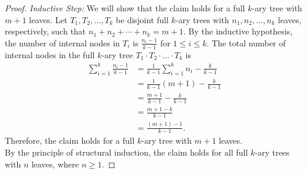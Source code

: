 \documentclass[a4paper, addpoints]{exam}
\theoremstyle{definition}
\theoremstyle{claim}
\begin{document}
\begin{questions}
\begin{solution}
\begin{proof}
      \textit{Inductive Step:} We will show that the claim holds for a full $k$-ary tree with $m+1$ leaves.
      Let $T_1,T_2,\ldots,T_k$ be disjoint full $k$-ary trees with $n_1,n_2,\ldots,n_k$ leaves, respectively, such that $n_1+n_2+\cdots+n_k=m+1$.
      By the inductive hypothesis, the number of internal nodes in $T_i$ is $\frac{n_i-1}{k-1}$ for $1\leq i\leq k$.
      The total number of internal nodes in the full $k$-ary tree $T_1\cdot T_2\cdot\ldots\cdot T_k$ is
      \begin{align*}
        \sum_{i=1}^{k}\frac{n_i-1}{k-1}&=\frac{1}{k-1}\sum_{i=1}^{k}n_i-\frac{k}{k-1}\\
        &=\frac{1}{k-1}(m+1)-\frac{k}{k-1}\\
        &=\frac{m+1}{k-1}-\frac{k}{k-1}\\
        &=\frac{m+1-k}{k-1}\\
        &=\frac{(m+1)-1}{k-1}.
      \end{align*}
      Therefore, the claim holds for a full $k$-ary tree with $m+1$ leaves. \\
      By the principle of structural induction, the claim holds for all full $k$-ary trees with $n$ leaves, where $n\geq 1$.
    \end{proof}
  \end{solution}
\end{questions}
\end{document}
